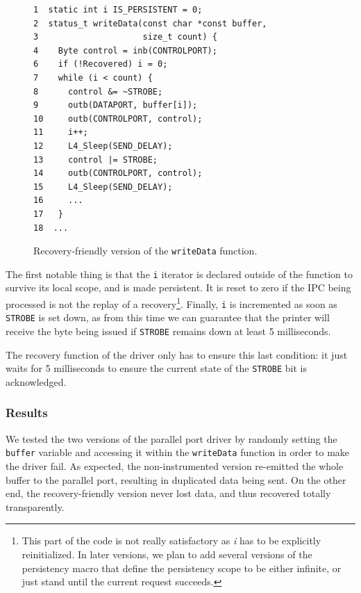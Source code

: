 \documentclass[times, 10pt, twocolumn]{article}
\begin{document}
\begin{figure}[ht]
\centering
\begin{screen}
\scriptsize{
\begin{verbatim}
1  static int i IS_PERSISTENT = 0;
2  status_t writeData(const char *const buffer,
3                     size_t count) {
4    Byte control = inb(CONTROLPORT);
6    if (!Recovered) i = 0;
7    while (i < count) {
8      control &= ~STROBE;
9      outb(DATAPORT, buffer[i]);
10     outb(CONTROLPORT, control);
11     i++;
12     L4_Sleep(SEND_DELAY);
13     control |= STROBE;
14     outb(CONTROLPORT, control);
15     L4_Sleep(SEND_DELAY);
16     ...
17   }
18  ...
\end{verbatim}
}
\end{screen}
\caption{Recovery-friendly version of the \texttt{writeData} function.}
\label{fig:writeDataRecover}
\end{figure}

The first notable thing is that the \texttt{i} iterator is declared outside of the function to survive its local scope, and is made persistent. It is reset to zero if the IPC being processed is not the replay of a recovery\footnote{This part of the code is not really satisfactory as \textit{i} has to be explicitly reinitialized. In later versions, we plan to add several versions of the persistency macro that define the persistency scope to be either infinite, or just stand until the current request succeeds.}. Finally, \texttt{i} is incremented as soon as \texttt{STROBE} is set down, as from this time we can guarantee that the printer will receive the byte being issued if \texttt{STROBE} remains down at least 5 milliseconds.

The recovery function of the driver only has to ensure this last condition: it just waits for 5 milliseconds to ensure the current state of the \texttt{STROBE} bit is acknowledged.

\subsubsection{Results}
We tested the two versions of the parallel port driver by randomly setting the \texttt{buffer} variable and accessing it within the \texttt{writeData} function in order to make the driver fail. As expected, the non-instrumented version re-emitted the whole buffer to the parallel port, resulting in duplicated data being sent. On the other end, the recovery-friendly version never lost data, and thus recovered totally transparently.
\end{document}

